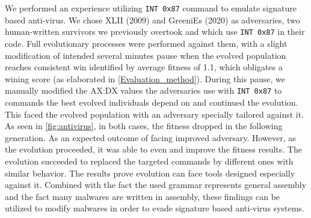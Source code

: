 \documentclass[dvipsnames, format=sigconf]{acmart}
\begin{document}
We performed an experience utilizing \texttt{INT 0x87} command to emulate signature based anti-virus. We chose XLII (2009) and GreeniEs (2020) as adversaries, two human-written survivors we previously overtook and which use \texttt{INT 0x87} in their code. Full evolutionary processes were performed against them, with a slight modification of intended several minutes pause when the evolved population reaches consistent win identified by average fitness of 1.1, which obligates a wining score (as elaborated in \autoref{Evaluation_method}). During this pause, we manually modified the AX:DX values the adversaries use with  \texttt{INT 0x87} to commands the best evolved individuals depend on and continued the evolution. This faced the evolved population with an adversary specially tailored against it.
As seen in \autoref{fig:antivirus}, in both cases, the fitness dropped in the following generation. As an expected outcome of facing improved adversary. However, as the evolution proceeded, it was able to even and improve the fitness results. 
The evolution succeeded to replaced the targeted commands by different ones with similar behavior.  
The results prove evolution can face tools designed especially against it. Combined with the fact the used grammar represents general assembly and the fact many malwares are written in assembly, these findings can be utilized to modify malwares in order to evade signature based anti-virus systems. 
\end{document}
